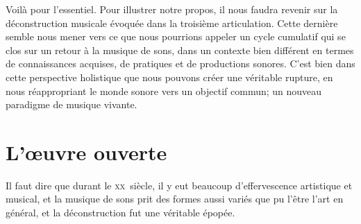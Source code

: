 \documentclass{article}
\begin{document}






\bigskip

Voilà pour l'essentiel. Pour illustrer notre propos, il nous faudra revenir sur la déconstruction musicale évoquée dans la troisième articulation. Cette dernière semble nous mener vers ce que nous pourrions appeler un cycle cumulatif qui se clos sur un retour à la musique de sons, dans un contexte bien différent en termes de connaissances acquises, de pratiques et de productions sonores. %
C'est bien dans cette perspective holistique que nous pouvons créer une véritable rupture, en nous réappropriant le monde sonore vers un objectif commun; un nouveau paradigme de musique vivante.


%    
  

\section{L'œuvre ouverte}

Il faut dire que durant le \textsc{xx}\ieme ~siècle, il y eut beaucoup d'effervescence artistique et musical, et la musique de sons prit des formes aussi variés que pu l'être l'art en général, et la déconstruction fut une véritable épopée.
\end{document}
